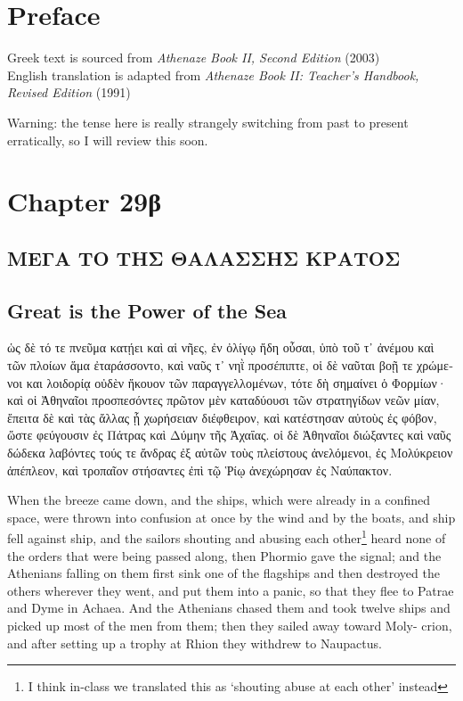 \documentclass{article}
\begin{document}
\section{Preface}

Greek text is sourced from \emph{Athenaze Book II, Second Edition} (2003) \\
English translation is adapted from \emph{Athenaze Book II: Teacher's Handbook, Revised Edition} (1991)

Warning: the tense here is really strangely switching from past to present erratically,
so I will review this soon.

\section{Chapter 29\textgreek{β}}

\subsection*{\textgreek{ΜΕΓΑ ΤΟ ΤΗΣ ΘΑΛΑΣΣΗΣ ΚΡΑΤΟΣ}}
\subsection*{Great is the Power of the Sea}

\begin{greek}
ὡς δὲ τό τε πνεῦμα κατῄει καὶ αἱ νῆες, ἐν ὀλίγῳ ἤδη οὖσαι,
ὑπὸ τοῦ τ᾿ ἀνέμου καὶ τῶν πλοίων ἅμα ἐταράσσοντο, καὶ ναῦς τ᾿ νηῒ προσέπιπτε,
οἱ δὲ ναῦται βοῇ τε χρώμενοι και λοιδορίᾳ οὐδὲν ἤκουον τῶν παραγγελλομένων, τότε δὴ σημαίνει ὁ Φορμίων·
καὶ οἱ Ἀθηναῖοι προσπεσόντες πρῶτον μὲν καταδύουσι τῶν στρατηγίδων νεῶν μίαν, ἔπειτα δὲ καὶ τὰς ἄλλας ᾗ χωρήσειαν διέφθειρον,
καὶ κατέστησαν αὐτοὺς ἐς φόβον, ὥστε φεύγουσιν ἐς Πάτρας καὶ Δύμην τῆς Ἀχαΐας.
οἱ δὲ Ἀθηναῖοι διώξαντες καὶ ναῦς δώδεκα λαβόντες τούς τε ἄνδρας ἐξ αὐτῶν τοὺς πλείστους ἀνελόμενοι,
ἐς Μολύκρειον ἀπέπλεον, καὶ τροπαῖον στήσαντες ἐπὶ τῷ Ῥίῳ ἀνεχώρησαν ἐς Ναύπακτον. \\
\end{greek}


When the breeze came down, and the ships, which were already in a confined space, were thrown into confusion at once by the wind and by the boats,
and ship fell against ship, and the sailors shouting and abusing each other\footnote{I think in-class we translated this as `shouting abuse at each other' instead}
heard none of the orders that were being passed along,
then Phormio gave the signal; and the Athenians falling on them first sink one of the flagships and then destroyed the others wherever they went,
and put them into a panic, so that they flee to Patrae and Dyme in Achaea.
And the Athenians chased them and took twelve ships and picked up most of the men from them;
then they sailed away toward Moly- crion,
and after setting up a trophy at Rhion they withdrew to Naupactus. \\
\end{document}
